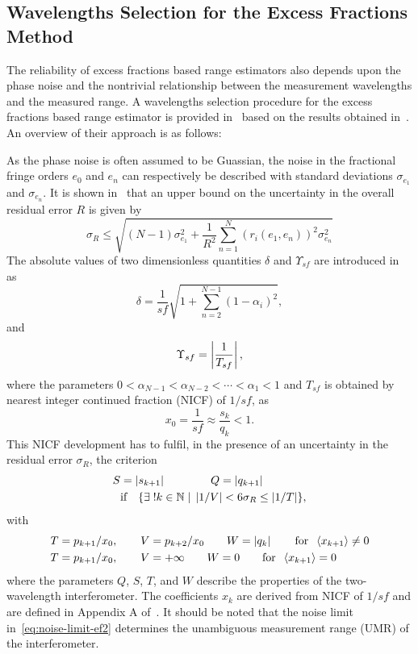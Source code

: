 \subsection{Wavelengths Selection for the Excess Fractions Method}

The reliability of excess fractions based range estimators also depends upon the phase noise and the nontrivial relationship between the measurement wavelengths and the measured range. A wavelengths selection procedure for the excess fractions based range estimator is provided in~\cite{Falaggis_excess_fractions_2012} based on the results obtained in~\cite{Falaggis_excess_fractions_2011}. An overview of their approach is as follows:

As the phase noise is often assumed to be Guassian, the noise in the fractional fringe orders $e_0$ and $e_n$ can respectively be described with standard deviations $\sigma_{e_1}$ and $\sigma_{e_n}$. It is shown in~\cite{Falaggis_excess_fractions_2011} that an upper bound on the uncertainty in the overall residual error $R$ is given by
\begin{equation}\label{eq:noise-criterion-ef}
\sigma_R \leq \sqrt{   (N-1)\sigma_{e_1}^2 + \frac{1}{R^2} \sum_{n=1}^{N} (r_i(e_1, e_n))^2 \sigma_{e_n}^2      }
\end{equation}
The absolute values of two dimensionless quantities $\delta$ and $\Upsilon_{sf}$ are introduced in~\cite{Falaggis_excess_fractions_2011, Falaggis_excess_fractions_2012} as
\[
\delta = \frac{1}{sf}\sqrt{1 + \sum_{n=2}^{N-1}(1 - \alpha_i)^2},
\]
and
\begin{equation}\label{eq:Upsilon-NICF}
\Upsilon_{sf} = \left\vert \frac{1}{T_{sf}} \right\vert,
\end{equation}
where the parameters $0 < \alpha_{N-1} < \alpha_{N-2} < \cdots < \alpha_1 < 1$ and $T_{sf}$ is obtained by nearest integer continued fraction (NICF) of $1/sf$, as
\[
x_0 = \frac{1}{sf} \approx \frac{s_k}{q_k} < 1.
\]
This NICF development has to fulfil, in the presence of an uncertainty in the residual error $\sigma_R$, the criterion~\cite{Falaggis_excess_fractions_2011, Falaggis_excess_fractions_2012}
\begin{align}
S &= \left\vert s_{k+1} \right\vert \qquad \qquad Q = \left\vert q_{k+1} \right\vert \label{eq:noise-limit-ef1} \\ 
&\text{if} \quad \{ \exists\; !k \in \mathbb{N} \;| \; \left\vert 1/V \right\vert < 6\sigma_R \leq \left\vert 1/T \right\vert \}, \label{eq:noise-limit-ef2}
\end{align}
with 
\begin{align}
T &= p_{k+1}/x_0, \qquad V = p_{k+2}/x_0 \qquad W = \left\vert q_k \right\vert \qquad \text{for}\;\; \left\langle x_{k+1} \right\rangle \neq 0 \\
T &= p_{k+1}/x_0, \qquad V = +\infty \qquad W = 0 \qquad \text{for}\;\; \left\langle x_{k+1} \right\rangle = 0
\end{align}
where the parameters $Q$, $S$, $T$, and $W$ describe the properties of the two-wavelength interferometer. The coefficients $x_k$ are derived from NICF of $1/sf$ and are defined in Appendix A of~\cite{Falaggis_excess_fractions_2011}. It should be noted that the noise limit  in~\ref{eq:noise-limit-ef2} determines the unambiguous measurement range (UMR) of the interferometer.

